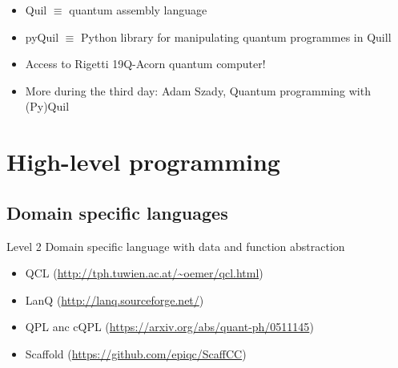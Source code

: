 \documentclass{beamer}
\begin{document}
\begin{frame}{\insertsection}{\insertsubsection}
	\begin{itemize}
        \item<1-> Quil $\equiv$ quantum assembly language
        \item<2-> pyQuil $\equiv$ Python library for manipulating quantum 
        programmes in Quill
        \item<3-> Access to Rigetti 19Q-Acorn quantum computer!
        \item<4-> More during the third day: Adam Szady, Quantum programming 
        with (Py)Quil
    \end{itemize}
\end{frame}


\section{High-level programming}


\subsection{Domain specific languages}

\begin{frame}{\insertsection}{\insertsubsection}

\begin{block}{Level 2}
Domain specific language with data and function abstraction
\end{block}

\begin{itemize}
    \item QCL (\url{http://tph.tuwien.ac.at/~oemer/qcl.html})
    \item LanQ (\url{http://lanq.sourceforge.net/})
    \item QPL anc cQPL (\url{https://arxiv.org/abs/quant-ph/0511145})
    \item Scaffold (\url{https://github.com/epiqc/ScaffCC})
\end{itemize}
\end{frame}


\end{document}
